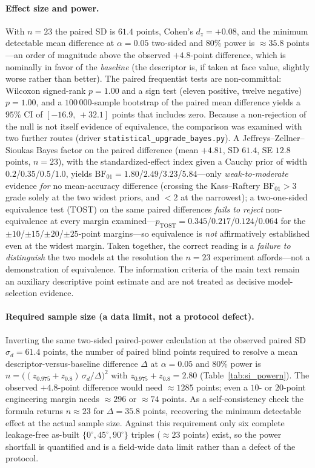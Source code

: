 \documentclass[11pt,a4paper,twocolumn]{article}
\providecommand{\ang}[1]{\ensuremath{#1^{\circ}}}
\begin{document}
\paragraph{Effect size and power.}
With $n = 23$ the paired SD is $61.4$ points, Cohen's $d_z = +0.08$, and the minimum detectable mean difference
at $\alpha = 0.05$ two-sided and $80\%$ power is $\approx 35.8$ points---an order of magnitude above the observed
$+4.8$-point difference, which is nominally in favor of the \emph{baseline} (the descriptor is, if taken at face
value, slightly worse rather than better). The paired frequentist tests are non-committal: Wilcoxon signed-rank
$p = 1.00$ and a sign test (eleven positive, twelve negative) $p = 1.00$, and a $100\,000$-sample bootstrap of the
paired mean difference yields a $95\%$ CI of $[-16.9,\,+32.1]$ points that includes zero. Because a non-rejection of the null is not itself evidence of
equivalence, the comparison was examined with two further routes (driver \texttt{statistical\_upgrade\_bayes.py}).
A Jeffreys--Zellner--Sioukas Bayes factor on the paired difference (mean $+4.81$, SD $61.4$, SE $12.8$ points,
$n = 23$), with the standardized-effect index given a Cauchy prior of width $0.2$/$0.35$/$0.5$/$1.0$, yields
$\mathrm{BF}_{01} = 1.80$/$2.49$/$3.23$/$5.84$---only \emph{weak-to-moderate} evidence \emph{for} no mean-accuracy
difference (crossing the Kass--Raftery $\mathrm{BF}_{01} > 3$ grade solely at the two widest priors, and $<2$ at the
narrowest); a two-one-sided equivalence test (TOST) on the same paired differences \emph{fails to reject}
non-equivalence at every margin examined---$p_{\mathrm{TOST}} = 0.345$/$0.217$/$0.124$/$0.064$ for the
$\pm 10$/$\pm 15$/$\pm 20$/$\pm 25$-point margins---so equivalence is \emph{not} affirmatively established even at
the widest margin. Taken together, the correct reading is a \emph{failure to distinguish} the two models at the
resolution the $n = 23$ experiment affords---not a demonstration of equivalence. The information criteria of the
main text remain an auxiliary descriptive point estimate and are not treated as decisive model-selection evidence.

\paragraph{Required sample size (a data limit, not a protocol defect).}
Inverting the same two-sided paired-power calculation at the observed paired SD $\sigma_d = 61.4$ points, the number
of paired blind points required to resolve a mean descriptor-versus-baseline difference $\Delta$ at $\alpha = 0.05$
and $80\%$ power is $n = \big((z_{0.975}+z_{0.8})\,\sigma_d/\Delta\big)^2$ with $z_{0.975}+z_{0.8} = 2.80$
(Table~\ref{tab:si_powern}). The observed $+4.8$-point difference would need $\approx 1285$ points; even a $10$- or
$20$-point engineering margin needs $\approx 296$ or $\approx 74$ points. As a self-consistency check the formula
returns $n \approx 23$ for $\Delta = 35.8$ points, recovering the minimum detectable effect at the actual sample size.
Against this requirement only six complete leakage-free as-built $\{\ang{0},\ang{45},\ang{90}\}$ triples
($\approx 23$ points) exist, so the power shortfall is quantified and is a field-wide data limit rather than a defect
of the protocol.
\end{document}
